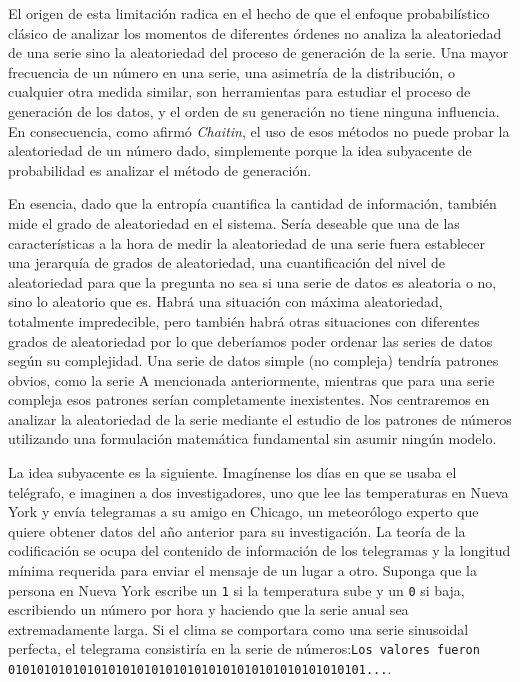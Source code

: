 \documentclass[a4paper,12pt]{article}
\begin{document}
El origen de esta limitación radica en el hecho de que el enfoque probabilístico clásico de analizar los momentos de diferentes órdenes no analiza la aleatoriedad de una serie sino la aleatoriedad del proceso de generación de la serie. Una mayor frecuencia de un número en una serie, una asimetría de la distribución, o cualquier otra medida similar, son herramientas para estudiar el proceso de generación de los datos, y el orden de su generación no tiene ninguna influencia. En consecuencia, como afirmó \textit{Chaitin}, el uso de esos métodos no puede probar la aleatoriedad de un número dado, simplemente porque la idea subyacente de probabilidad es analizar el método de generación. 

En esencia, dado que la entropía cuantifica la cantidad de información, también mide el grado de aleatoriedad en el sistema. Sería deseable que una de las características a la hora de medir la aleatoriedad de una serie fuera establecer una jerarquía de grados de aleatoriedad, una cuantificación del nivel de aleatoriedad para que la pregunta no sea si una serie de datos es aleatoria o no, sino lo aleatorio que es. Habrá una situación con máxima aleatoriedad, totalmente impredecible, pero también habrá otras situaciones con diferentes grados de aleatoriedad por lo que deberíamos poder ordenar las series de datos según su complejidad. Una serie de datos simple (no compleja) tendría patrones obvios, como la serie A mencionada anteriormente, mientras que para una serie compleja esos patrones serían completamente inexistentes. Nos centraremos en analizar la aleatoriedad de la serie mediante el estudio de los patrones de números utilizando una formulación matemática fundamental sin asumir ningún modelo.

La idea subyacente es la siguiente. Imagínense los días en que se usaba el telégrafo, e imaginen a dos investigadores, uno que lee las temperaturas en Nueva York y envía telegramas a su amigo en Chicago, un meteorólogo experto que quiere obtener datos del año anterior para su investigación. La teoría de la codificación se ocupa del contenido de información de los telegramas y la longitud mínima requerida para enviar el mensaje de un lugar a otro. Suponga que la persona en Nueva York escribe un \texttt{1} si la temperatura sube y un \texttt{0} si baja, escribiendo un número por hora y haciendo que la serie anual sea extremadamente larga. Si el clima se comportara como una serie sinusoidal perfecta, el telegrama consistiría en la serie de números:\texttt{Los valores fueron 01010101010101010101010101010101010101010101010101...}.
\end{document}
